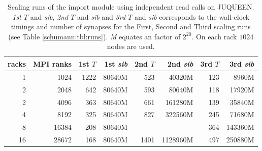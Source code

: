 \begin{table}[h!]
\begin{center}
\begin{tabular}{|r|r|r|r|r|r|r|r|}
\hline
racks & MPI ranks & 1st $T$ & 1st \emph{sib} & 2nd $T$ & 2nd \emph{sib} & 3rd $T$ & 3rd \emph{sib} \\
\hline\hline
1  & 1024      & 1222 & 80640M & 523 & 40320M & 123 & 8960M \\
2  & 2048      & 642 & 80640M  & 593 & 80640M & 118 & 17920M\\
2  & 4096      & 363 & 80640M  & 661 & 161280M & 139 & 35840M\\
4  & 8192     & 325 & 80640M & 827 & 322560M & 245 & 71680M \\
8  & 16384    & 208 & 80640M & -   & - &  364 & 143360M \\
16  & 28672    & 168 & 80640M & 1401 & 1128960M & 497 & 250880M\\
\hline
\end{tabular}
\end{center}
\caption[Scaling runs of the import module using independent read calls on JUQUEEN]{Scaling runs of the import module using independent read calls on JUQUEEN. \emph{1st $T$} and \emph{sib}, \emph{2nd $T$} and \emph{sib} and
  \emph{3rd $T$} and \emph{sib} corresponds to the wall-clock timings and number of synapses for the First, Second and Third scaling runs (see Table \ref{schumann:tbl:runs}). \emph{M} equates an factor of $2^{20}$. On each rack $1024$ nodes are used.}
\label{schumann:tbl:scalruns}
\end{table}



